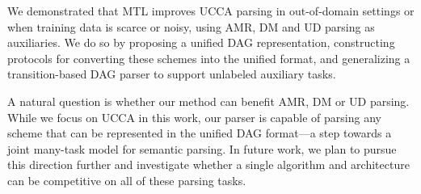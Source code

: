 \documentclass[11pt,a4paper]{article}
\begin{document}
We demonstrated that MTL improves UCCA parsing in out-of-domain settings or when training data is scarce or noisy,
using AMR, DM and UD parsing as auxiliaries.
We do so by proposing a unified DAG representation, constructing protocols for converting these schemes into the unified format,
and generalizing a transition-based DAG parser to support unlabeled auxiliary tasks.

A natural question is whether our method can benefit AMR, DM or UD parsing.
While we focus on UCCA in this work, our parser is capable of parsing any
scheme that can be represented in the unified DAG format---a
step towards a joint many-task model for semantic parsing.
In future work, we plan to pursue this direction further and investigate whether a single
algorithm and architecture can be competitive on all of these parsing tasks.




\end{document}
